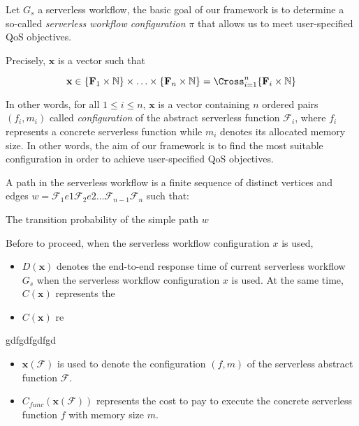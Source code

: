 Let $G_s$ a serverless workflow, the basic goal of our framework is to determine a so-called \textit{serverless workflow configuration} $\pi$ that allows us to meet user-specified QoS objectives.

Precisely, $\textbf{x}$ is a vector such that

\begin{equation}
\textbf{x} \in \lbrace \textbf{F}_1 \times \mathbb{N} \rbrace \times \ldots \times \lbrace \textbf{F}_n \times \mathbb{N} \rbrace = \Cross_{i = 1}^n \lbrace \textbf{F}_i \times \mathbb{N} \rbrace
\end{equation}

In other words, for all $1 \leq i \leq n$, $\textbf{x}$ is a vector containing $n$ ordered pairs $\left( f_i, m_i \right) $ called \textit{configuration} of the abstract serverless function $\mathscr{F}_i$, where $f_i$ represents a concrete serverless function while $m_i$ denotes its  allocated memory size. In other words, the aim of our framework is to find the most suitable configuration in order to achieve user-specified QoS objectives. 

 A path in the serverless workflow is a finite sequence of distinct vertices and edges $w =
\mathscr{F}_1 e1 \mathscr{F}_2 e2 \ldots \mathscr{F}_{n-1} \mathscr{F}_n$ such that:

The transition probability of the simple path $w$

Before to proceed, when the serverless workflow configuration $x$ is used,




\begin{itemize}
	\item $D(\textbf{x})$ denotes the end-to-end response time of current serverless workflow $G_s$ when the serverless workflow configuration $x$ is used. At the same time, $C(\textbf{x})$ represents the  
	\item $C(\textbf{x})$ re
\end{itemize}

gdfgdfgdfgd

\begin{itemize}
	\item $\textbf{x}(\mathscr{F})$ is used to denote the configuration $\left( f, m \right) $ of the serverless abstract function $\mathscr{F}$.
	\item $C_{func}(\textbf{x}(\mathscr{F}))$ represents the cost to pay to execute the concrete serverless function $f$ with memory size $m$.
\end{itemize}

